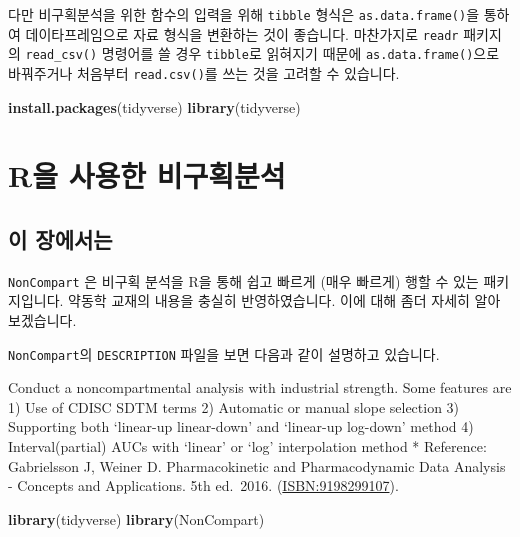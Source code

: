 \documentclass[
  10pt,
]{krantz}
\makeatletter
\newenvironment{Shaded}{\begin{snugshade}}{\end{snugshade}}
\newcommand{\KeywordTok}[1]{\textcolor[rgb]{0.13,0.29,0.53}{\textbf{#1}}}
\newcommand{\NormalTok}[1]{#1}
\newcommand{\StringTok}[1]{\textcolor[rgb]{0.31,0.60,0.02}{#1}}
\renewenvironment{quote}{\begin{VF}}{\end{VF}}
\newenvironment{kframe}{%
\medskip{}
\setlength{\fboxsep}{.8em}
 \def\at@end@of@kframe{}%
 \ifinner\ifhmode%
  \def\at@end@of@kframe{\end{minipage}}%
  \begin{minipage}{\columnwidth}%
 \fi\fi%
 \def\FrameCommand##1{\hskip\@totalleftmargin \hskip-\fboxsep
 \colorbox{shadecolor}{##1}\hskip-\fboxsep
     \hskip-\linewidth \hskip-\@totalleftmargin \hskip\columnwidth}%
 \MakeFramed {\advance\hsize-\width
   \@totalleftmargin\z@ \linewidth\hsize
   \@setminipage}}%
 {\par\unskip\endMakeFramed%
 \at@end@of@kframe}
\renewenvironment{Shaded}{\begin{kframe}}{\end{kframe}}
\makeatother
\begin{document}
다만 비구획분석을 위한 함수의 입력을 위해 \texttt{tibble} 형식은 \texttt{as.data.frame()}을 통하여 데이타프레임으로 자료 형식을 변환하는 것이 좋습니다.
마찬가지로 \texttt{readr} 패키지의 \texttt{read\_csv()} 명령어를 쓸 경우 \texttt{tibble}로 읽혀지기 때문에 \texttt{as.data.frame()}으로 바꿔주거나 처음부터 \texttt{read.csv()}를 쓰는 것을 고려할 수 있습니다.

\begin{Shaded}
\begin{Highlighting}[]
\KeywordTok{install.packages}\NormalTok{(}\StringTok{\textquotesingle{}tidyverse\textquotesingle{}}\NormalTok{)}
\KeywordTok{library}\NormalTok{(tidyverse)}
\end{Highlighting}
\end{Shaded}

\hypertarget{noncompart}{%
\chapter{R을 사용한 비구획분석}\label{noncompart}}

\hypertarget{summary-noncompart}{%
\section{이 장에서는}\label{summary-noncompart}}

\texttt{NonCompart} \citep{R-NonCompart}은 비구획 분석을 R을 통해 쉽고 빠르게 (매우 빠르게) 행할 수 있는 패키지입니다.
약동학 교재의 내용을 충실히 반영하였습니다. \citep{gab, tozer}
이에 대해 좀더 자세히 알아보겠습니다.

\texttt{NonCompart}의 \texttt{DESCRIPTION} 파일을 보면 다음과 같이 설명하고 있습니다.

\begin{quote}
Conduct a noncompartmental analysis with industrial strength.
Some features are
1) Use of CDISC SDTM terms
2) Automatic or manual slope selection
3) Supporting both `linear-up linear-down' and `linear-up log-down' method
4) Interval(partial) AUCs with `linear' or `log' interpolation method
* Reference: Gabrielsson J, Weiner D. Pharmacokinetic and Pharmacodynamic Data Analysis - Concepts and Applications. 5th ed.~2016. (\url{ISBN:9198299107}).
\end{quote}

\begin{Shaded}
\begin{Highlighting}[]
\KeywordTok{library}\NormalTok{(tidyverse)}
\KeywordTok{library}\NormalTok{(NonCompart)}
\end{Highlighting}
\end{Shaded}
\end{document}
